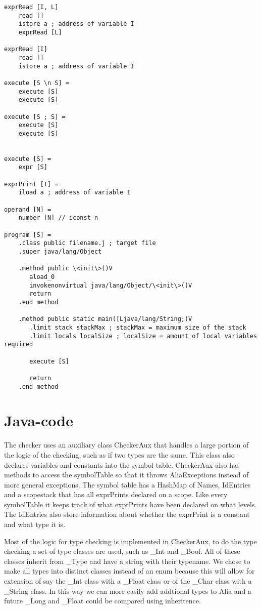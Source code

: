 \documentclass[paper=a4, fontsize=11pt]{article}
\numberwithin{equation}{section}		%
\numberwithin{figure}{section}			%
\numberwithin{table}{section}				%
\begin{document}
\begin{verbatim}
exprRead [I, L]
    read []
    istore a ; address of variable I
    exprRead [L]
    
exprRead [I]
    read []
    istore a ; address of variable I

execute [S \n S] =
    execute [S]
    execute [S]
    
execute [S ; S] =
    execute [S]
    execute [S]


execute [S] =
    expr [S]
    
exprPrint [I] =
    iload a ; address of variable I

operand [N] =
    number [N] // iconst n

program [S] =
    .class public filename.j ; target file
    .super java/lang/Object
    
    .method public \<init\>()V
       aload_0
       invokenonvirtual java/lang/Object/\<init\>()V
       return
    .end method
    
    .method public static main([Ljava/lang/String;)V
       .limit stack stackMax ; stackMax = maximum size of the stack
       .limit locals localSize ; localSize = amount of local variables required
       
       execute [S]
    
       return
    .end method
\end{verbatim}

\section{Java-code}
The checker uses an auxiliary class CheckerAux that handles a large portion of the logic of the checking, such as if two types are the same. This class also declares variables and constants into the symbol table. CheckerAux also has methods to access the symbolTable so that it throws AliaExceptions instead of more general exceptions. The symbol table has a HashMap of Names, IdEntries and a scopestack that has all exprPrints declared on a scope. Like every symbolTable it keeps track of what exprPrints have been declared on what levels. The IdEntries also store information about whether the exprPrint is a constant and what type it is.

Most of the logic for type checking is implemented in CheckerAux, to do the type checking a set of type classes are used, such as \_Int and \_Bool. All of these classes inherit from \_Type and have a string with their typename. We chose to make all types into distinct classes instead of an enum because this will allow for extension of say the \_Int class with a \_Float class or of the \_Char class with a \_String class. In this way we can more easily add addtional types to Alia and a future \_Long and \_Float could be compared using inheritence.
\end{document}

